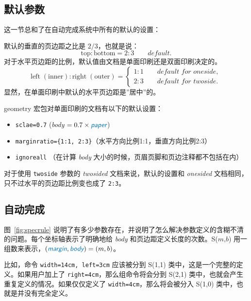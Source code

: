 \documentclass[titlepage]{ctexart}
\def\Gm{\textsf{geometry}}
\newcommand{\gpart}[1]{\textsf{\textsl{\color[rgb]{.0,.45,.7}#1}}}
\begin{document}
	 \subsection{默认参数}\label{sec:defaults}
	 
	 这一节总和了在自动完成系统中所有的默认的设置：
	 
	 默认的垂直的页边距之比是 $2/3$，也就是说：
	 \begin{equation}
	 \textrm{top} : \textrm{bottom} = 2 : 3 \qquad\textit{default}.
	 \end{equation}
	 对于水平页边距的比例，默认值由文档是单面印刷还是双面印刷决定的。
	 \begin{equation}
	  \textrm{left}\;(\textrm{inner}) : \textrm{right}\;(\textrm{outer}) 
	       = \left\{ \begin{array}{ll}
	              1 : 1 \qquad\textit{default for oneside},\\
	              2 : 3 \qquad\textit{default for twoside}.
	         \end{array}\right.
	 \end{equation}
	 显然，在单面印刷中默认的水平页边距是''居中''的。
	 
	 \Gm{} 宏包对单面印刷的文档有以下的默认设置：
	 \begin{itemize}\setlength{\itemsep}{-.5\parsep}
	 	\item \verb|sclae=0.7| (\gpart{body} $=0.7 \times \gpart{paper}$)
	 	\item \verb|marginratio={1:1, 2:3}|（水平方向比例1:1，垂直方向比例2:3） 
	 	\item \verb|ignoreall| （在计算 \gpart{body} 大小的时候，页眉页脚和页边注释都不包括在内）
	 \end{itemize}
	 对于使用 \verb|twoside| 参数的 \textit{twosided} 文档来说，默认的设置和 \textit{onesided} 文档相同，只不过水平的页边距比例变也成了 \verb|2:3|。	
	 
	\subsection{自动完成}\label{sec:rules}
	 图~\ref{fig:specrule} 说明了有多少参数存在，并说明了怎么解决参数定义的含糊不清的问题。每个坐标轴表示了明确地给 \gpart{body} 和页边距定义长度的次数。S($m$,$b$) 用一组数来表示，$(\gpart{margin}, \gpart{body})=(m,b)$。
	 
	 比如，命令 \verb|width=14cm, left=3cm| 应该被分到 S(1,1) 类中，这是一个完整的定义。如果用户加上了 \verb|right=4cm|，那么组命令将会分到 S(2,1) 类中，也就会产生重复定义的情况。如果仅仅定义了 \verb|width=4cm|，那么将会被分入 S(1,0) 类中，也就是并没有完全定义。
	 
\end{document}
